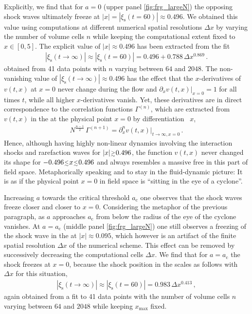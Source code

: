 Explicitly, we find that for $a = 0$ (upper panel \cref{fig:frg_largeN}) the opposing shock waves ultimately freeze at ${| x | = |\xi_\mathrm{s} ( t = 60 )| \approx 0.496}$.
We obtained this value using computations at different numerical spatial resolutions $\Delta x$ by varying the number of volume cells $n$ while keeping the computational extent fixed to $x\in[0,5]$.
The explicit value of $| x | \approx 0.496$ has been extracted from the fit
	\begin{align}
		|\xi_\mathrm{s} ( t \rightarrow \infty )| \approx |\xi_\mathrm{s} ( t = 60 )| =0.496 + 0.788\, \Delta x^{0.869}\, .\label{eq:xis_0ac_fit}
	\end{align}
obtained from 41 data points with $n$ varying between $64$ and $2048$.
The non-vanishing value of ${|\xi_\mathrm{s} ( t \rightarrow \infty )|\approx 0.496}$  has the effect that the $x$-derivatives of $v ( t, x )$ at ${x = 0}$ never change during the \frg{} flow and ${\partial_x v ( t, x ) \big|_{x = 0} = 1}$ for all times $t$, while all higher $x$-derivatives vanish.
Yet, these derivatives are in direct correspondence to the \ipi{} correlation functions $\Gamma^{(n)}$, which are extracted from $v ( t, x )$ in the \ir{} at the physical point ${x = 0}$ by differentiation \wrt{}\ $x$,
	\begin{align}
		N^{\frac{n - 1}{2}} \, \Gamma^{(n + 1)} = \partial_x^n v ( t,  x ) \big|_{t \rightarrow \infty, x = 0} \, .	\label{eq:1pi_ir}
	\end{align}
Hence, although having highly non-linear dynamics involving the interaction shocks and rarefaction waves for ${|x| \smallergtrsim 0.496}$, the function $v ( t, x )$ never changed its shape for ${- 0.496 \smallerlesssim x \smallerlesssim 0.496}$ and always resembles a massive free \qft{} in this part of field space.
Metaphorically speaking and to stay in the fluid-dynamic picture: It is as if the physical point $x = 0$ in field space is ``sitting in the eye of a cyclone''.

Increasing $a$ towards the critical threshold $a_\mathrm{c}$ one observes that the shock waves freeze closer and closer to $x = 0$. Considering the metaphor of the previous paragraph, as $a$ approaches $a_\mathrm{c}$ from below the radius of the eye of the cyclone vanishes.
At $a = a_\mathrm{c}$ (middle panel \cref{fig:frg_largeN}) one still observes a freezing of the shock wave in the \ir{} at $|x| \approx 0.095$, which however is an artifact of the finite spatial resolution $\Delta x$ of the numerical scheme.
This effect can be removed by successively decreasing the \fv{} computational cells $\Delta x$. We find that for $a = a_\mathrm{c}$ the shock freezes at $x = 0$, because the shock position in the \ir{} scales as follows with $\Delta x$ for this situation,
	\begin{align}
		|\xi_\mathrm{s} ( t \rightarrow \infty )| \approx |\xi_\mathrm{s} ( t = 60 )| = 0.983\, \Delta x^{0.413}\, ,\label{eq:xis_1ac_fit}
	\end{align}
again obtained from a fit to 41 data points with the number of volume cells $n$ varying between $64$ and $2048$ while keeping $x_\mathrm{max}$ fixed.

